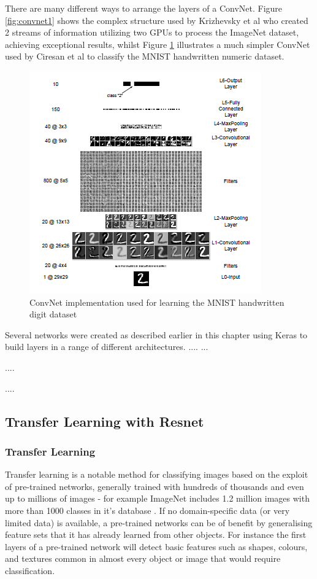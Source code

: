 \documentclass[fleqn,twoside]{article}
\begin{document}
There are many different ways to arrange the layers of a ConvNet. Figure \ref{fig:convnet1} shows the complex structure used by Krizhevsky et al \cite{krizhevsky} who created 2 streams of information utilizing two GPUs to process the ImageNet dataset, achieving exceptional results, whilst Figure \ref{fig:convnet2} illustrates a much simpler ConvNet used by Ciresan et al \cite{ciresan} to classify the MNIST handwritten numeric dataset. 

\begin{figure}[h]
	\centering
	\includegraphics[width=0.7\linewidth]{convnet2.png}
	\caption{ ConvNet implementation used for learning the MNIST handwritten digit dataset}
	\label{fig:convnet2}
\end{figure}%
	

Several networks were created as described earlier in this chapter using Keras to build layers in a range of different architectures.  
....
...


....

....


\subsection{Transfer Learning with Resnet}


\subsubsection{Transfer Learning}

Transfer learning is a notable method for classifying images based on the exploit of pre-trained networks, generally trained with hundreds of thousands and even up to millions of images - for example ImageNet includes 1.2 million images with more than 1000 classes in it's database \cite{shin}. If no domain-specific data (or very limited data) is available, a pre-trained networks can be of benefit by generalising feature sets that it has already learned from other objects. For instance the first layers of a pre-trained network will detect basic features such as shapes, colours, and textures common in almost every object or image that would require classification. 
\end{document}
